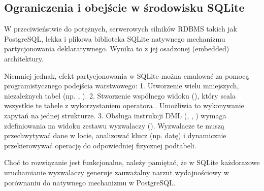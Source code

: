 \documentclass[a4paper,11pt,english,openany,oneside]{sphinxmanual}
\begin{document}
\subsection{Ograniczenia i obejście w środowisku SQLite}
\label{\detokenize{rozdzial_2/rozdzial_26/index:ograniczenia-i-obejscie-w-srodowisku-sqlite}}
\sphinxAtStartPar
W przeciwieństwie do potężnych, serwerowych silników RDBMS takich jak PostgreSQL, lekka i plikowa biblioteka SQLite  natywnego mechanizmu partycjonowania deklaratywnego. Wynika to z jej osadzonej (embedded) architektury.

\sphinxAtStartPar
Niemniej jednak, efekt partycjonowania w SQLite można emulować za pomocą programistycznego podejścia warstwowego:
1.  Utworzenie wielu mniejszych, niezależnych tabel (np. , ).
2.  Stworzenie wspólnego widoku (), który scala wszystkie te tabele z wykorzystaniem operatora . Umożliwia to wykonywanie zapytań  na jednej strukturze.
3.  Obsługa instrukcji DML (, , ) wymaga zdefiniowania na widoku zestawu wyzwalaczy (). Wyzwalacze te muszą przechwytywać dane w locie, analizować klucz (np. datę) i dynamicznie przekierowywać operację do odpowiedniej fizycznej pod\sphinxhyphen{}tabeli.

\sphinxAtStartPar
Choć to rozwiązanie jest funkcjonalne, należy pamiętać, że w SQLite każdorazowe uruchamianie wyzwalaczy generuje zauważalny narzut wydajnościowy w porównaniu do natywnego mechanizmu w PostgreSQL.

\sphinxstepscope
\end{document}
